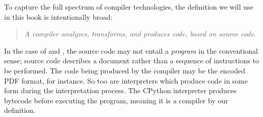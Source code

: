 \vspace{0.5em}

To capture the full spectrum of compiler technologies,
the definition we will use in this book is intentionally broad:
\begin{quotation}
\textit{
    A compiler analyzes, transforms, and produces code, based on source code.
}
\end{quotation}

In the case of \tex and \metafont, the source code
may not entail a \textit{program} in the conventional sense;
\tex source code describes a document rather than a sequence of
instructions to be performed.
The code being produced by the compiler may be the encoded PDF format, for instance.
So too are interpreters which produce code in some form during the interpretation process.
The CPython interpreter produces bytecode before executing the program,
meaning it is a compiler by our definition.
